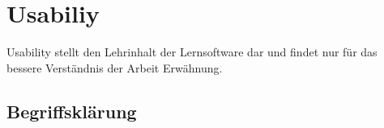\documentclass[a4paper, 12pt, twoside, BCOR=20mm, DIV=calc, abstracton, parskip=half*, toc=bibliography, toc=listof, headsepline, footsepline, headings=small, numbers=enddot]{scrreprt}
\begin{document}
	
	

\chapter{Usabiliy}
Usability stellt den Lehrinhalt der Lernsoftware dar und findet nur für das bessere Verständnis der Arbeit Erwähnung.
\section{Begriffsklärung}
\end{document}
